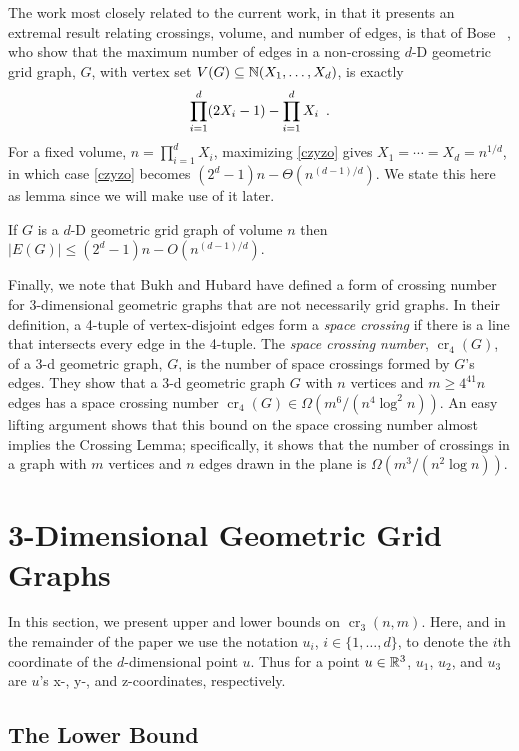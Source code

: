 \documentclass{patmorin}
\DeclareMathOperator{\crs}{cr}
\begin{document}
The work most closely related to the current work, in that it presents
an extremal result relating crossings, volume, and number of edges, is
that of Bose \etal~\cite{bose.czyzowicz.ea:maximum}, who show that the
maximum number of edges in a non-crossing $d$-D geometric grid graph,
$G$, with vertex set $V(G)\subseteq \mathbb{N}(X_1,\ldots,X_d)$, is exactly
\begin{equation}
    \prod_{i=1}^d (2X_i-1) - \prod_{i=1}^d X_i \enspace . \eqlabel{czyzo}
\end{equation}
For a fixed volume, $n=\prod_{i=1}^d X_i$, maximizing \eqref{czyzo}
gives $X_1=\cdots=X_d=n^{1/d}$, in which case \eqref{czyzo} becomes
$(2^d-1)n - \Theta(n^{(d-1)/d})$.  We state this here as lemma since we
will make use of it later.
\begin{lem}
  If $G$ is a $d$-D geometric grid graph of volume $n$
  then $|E(G)|\le(2^d-1)n - O(n^{(d-1)/d})$.
\end{lem}

Finally, we note that Bukh and Hubard \cite{bukh.hubard:space} have
defined a form of crossing number for 3-dimensional geometric graphs
that are not necessarily grid graphs.  In their definition, a 4-tuple
of vertex-disjoint edges form a \emph{space crossing} if there is
a line that intersects every edge in the 4-tuple.  The \emph{space
crossing number}, $\crs_4(G)$, of a 3-d geometric graph, $G$, is the
number of space crossings formed by $G$'s edges.  They show that a
3-d geometric graph $G$ with $n$ vertices and $m\ge 4^{41}n$ edges
has a space crossing number $\crs_4(G) \in \Omega(m^6/(n^4\log^2 n))$.
An easy lifting argument shows that this bound on the space crossing
number almost implies the Crossing Lemma; specifically, it shows that
the number of crossings in a graph with $m$ vertices and $n$ edges drawn
in the plane is $\Omega(m^3/(n^2\log n))$.

\section{3-Dimensional Geometric Grid Graphs}

In this section, we present upper and lower bounds on $\crs_3(n,m)$.
Here, and in the remainder of the paper we use the notation
$u_i$, $i\in\{1,\ldots,d\}$, to denote the $i$th coordinate of the
$d$-dimensional point $u$.  Thus for a point $u\in\mathbb{R}^3$, $u_1$, $u_2$,
and $u_3$ are $u$'s x-, y-, and z-coordinates, respectively.

\subsection{The Lower Bound}
\end{document}
